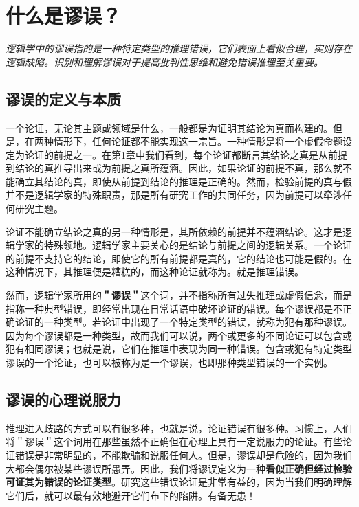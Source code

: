 \section{什么是谬误？}

\begin{logicbox}[title=引言]
\textit{逻辑学中的谬误指的是一种特定类型的推理错误，它们表面上看似合理，实则存在逻辑缺陷。识别和理解谬误对于提高批判性思维和避免错误推理至关重要。}
\end{logicbox}

\subsection{谬误的定义与本质}

一个论证，无论其主题或领域是什么，一般都是为证明其结论为真而构建的。但是，在两种情形下，任何论证都不能实现这一宗旨。一种情形是将一个虚假命题设定为论证的前提之一。在第1章中我们看到，每个论证都断言其结论之真是从前提到结论的真推导出来或为前提之真所蕴涵。因此，如果论证的前提不真，那么就不能确立其结论的真，即使从前提到结论的推理是正确的。然而，检验前提的真与假并不是逻辑学家的特殊职责，那是所有研究工作的共同任务，因为前提可以牵涉任何研究主题。

论证不能确立结论之真的另一种情形是，其所依赖的前提并不蕴涵结论。这才是逻辑学家的特殊领地。逻辑学家主要关心的是结论与前提之间的逻辑关系。一个论证的前提不支持它的结论，即使它的所有前提都是真的，它的结论也可能是假的。在这种情况下，其推理便是糟糕的，而这种论证就称为。就是推理错误。

然而，逻辑学家所用的\textbf{＂谬误＂}这个词，并不指称所有过失推理或虚假信念，而是指称一种典型错误，即经常出现在日常话语中破坏论证的错误。每个谬误都是不正确论证的一种类型。若论证中出现了一个特定类型的错误，就称为犯有那种谬误。因为每个谬误都是一种类型，故而我们可以说，两个或更多的不同论证可以包含或犯有相同谬误；也就是说，它们在推理中表现为同一种错误。包含或犯有特定类型谬误的一个论证，也可以被称为是一个谬误，也即那种类型错误的一个实例。

\subsection{谬误的心理说服力}

推理进入歧路的方式可以有很多种，也就是说，论证错误有很多种。习惯上，人们将＂谬误＂这个词用在那些虽然不正确但在心理上具有一定说服力的论证。有些论证错误是非常明显的，不能欺骗和说服任何人。但是，谬误却是危险的，因为我们大都会偶尔被某些谬误所愚弄。因此，我们将谬误定义为一种\textbf{看似正确但经过检验可证其为错误的论证类型}。研究这些错误论证是非常有益的，因为当我们明确理解它们后，就可以最有效地避开它们布下的陷阱。有备无患！

